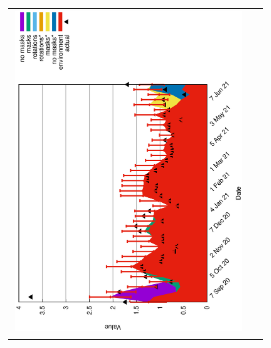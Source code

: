 \documentclass{letter}
\begin{document}
\begin{center}
\begin{tabular}{cc}
\includegraphics[angle=270,width=6cm]{rho4.eps}
\end{tabular}
\end{center}
\end{document}
